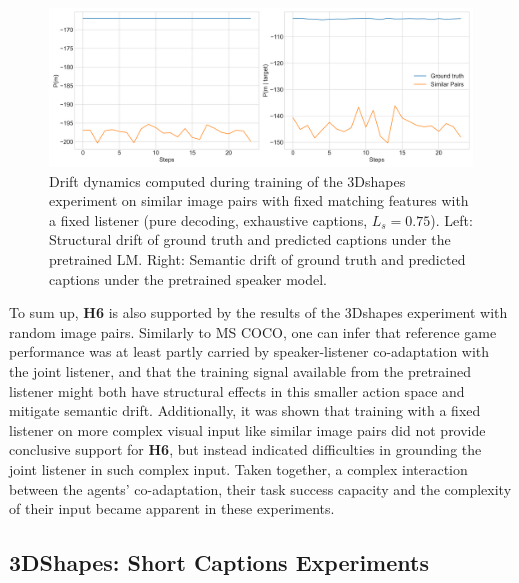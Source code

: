 \begin{figure}[h]
	\centering
	\includegraphics[width=\linewidth]{images/3dshapes_structural_semantic_drift_fixedListener_similarFixed_075.png}
	\caption{Drift dynamics computed during training of the 3Dshapes experiment on similar image pairs with fixed matching features with a fixed listener (pure decoding, exhaustive captions, $L_s = 0.75$). Left: Structural drift of ground truth and predicted captions under the pretrained LM. Right: Semantic drift of ground truth and predicted captions under the pretrained speaker model.}
	\label{fig:3dshapes_similarFixed_fixedListener_075_tr_sem_drift}
\end{figure}

To sum up, \textbf{H6} is also supported by the results of the 3Dshapes experiment with random image  pairs. Similarly to MS COCO, one can infer that reference game performance was at least partly carried by speaker-listener co-adaptation with the joint listener, and that the training signal available from the pretrained listener might both have structural effects in this smaller action space and mitigate semantic drift. 
Additionally, it was shown that training with a fixed listener on more complex visual input like similar image pairs did not provide conclusive support for \textbf{H6}, but instead indicated difficulties in grounding the joint listener in such complex input. Taken together, a complex interaction between the agents' co-adaptation, their task success capacity and the complexity of their input became apparent in these experiments.

\subsection{3DShapes: Short Captions Experiments}
\label{expt:3dshapes_short}

